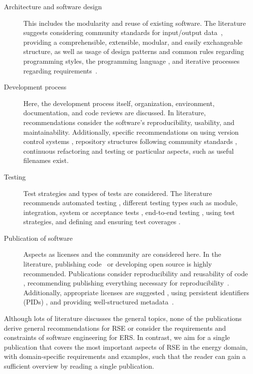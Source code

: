 \begin{description}
\item[Architecture and software design] This includes the modularity and reuse of existing software. The literature suggests considering community standards for input/output data~\cite{castell2024towards}, providing a comprehensible, extensible, modular, and easily exchangeable structure, as well as usage of design patterns and common rules regarding programming styles, the programming language \cite{drlsoftwareinitiative}, and iterative processes regarding requirements~\cite{johanson2018software}.
\item[Development process] Here, the development process itself, organization, environment, documentation, and code reviews are discussed. In literature, recommendations consider the software's reproducibility, usability, and maintainability. Additionally, specific recommendations on using version control systems \cite{castell2024towards}, repository structures following community standards \cite{castell2024towards},  continuous refactoring and testing \cite{drlsoftwareinitiative} or particular aspects, such as useful filenames \cite{trisovic2022large} exist.
\item[Testing] Test strategies and types of tests are considered. The literature recommends automated testing \cite{castell2024towards, drlsoftwareinitiative}, different testing types such as module, integration, system or acceptance tests \cite{drlsoftwareinitiative}, end-to-end testing \cite{hunter2021ten}, using test strategies, and defining and ensuring test coverages \cite{drlsoftwareinitiative}. 
\item[Publication of software] Aspects as licenses and the community are considered here. In the literature, publishing code~\cite{barnes2010publish} or developing open source \cite{hasselbring2020open} is highly recommended. Publications consider reproducibility and reusability of code \cite{gruenpeter2020m2}, recommending publishing everything necessary for reproducibility~\cite{stodden2016enhancing}. Additionally, appropriate licenses are suggested \cite{castell2024towards}, using persistent identifiers (PIDs) \cite{castell2024towards}, and providing well-structured metadata~\cite{castell2024towards}.
\end{description}

Although lots of literature discusses the general topics, none of the publications derive general recommendations for \ac{RSE} or 
consider the requirements and constraints of software engineering for \ac{ERS}. 
In contrast, we aim for a single publication that covers the most important aspects of \ac{RSE} in the energy domain, with domain-specific requirements and examples, such that the reader can gain a sufficient overview by reading a single publication.